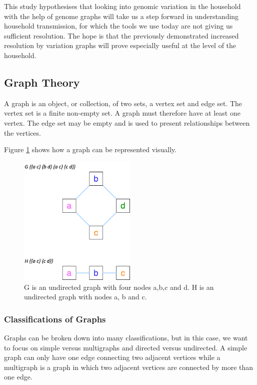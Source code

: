\documentclass[10pt, a4paper]{article}
\begin{document}
This study hypothesises that looking into genomic variation in the household
with the help of genome graphs will take us a step forward in understanding
household transmission, for which the tools we use today are not giving us
sufficient resolution.
The hope is that the previously demonstrated increased resolution by variation
graphs \cite{garrisonVariationGraphToolkit2018} will prove especially useful at
the level of the household.


\clearpage

\subsection{Graph Theory}
\label{sec:orgc90ab18}
A graph is an object, or collection, of two sets, a vertex set and edge set.
The vertex set is a finite non-empty set. A graph must therefore have at least
one vertex.
The edge set may be empty \cite{trudeauIntroductionGraphTheory1993}
and is used to present relationships between the vertices.

Figure \ref{fig:org6a5543e} shows how a graph can be represented
visually.


\begin{figure}[!ht]
\centering
\includegraphics[width=0.5\textwidth]{../Figures/Three-and-four-node-graph.png}
\caption[A Three Node and A Four Node Graph]{\label{fig:org6a5543e}G is an undirected graph with four nodes a,b,c and d. H is an undirected graph with nodes a, b and c.}
\end{figure}

\subsubsection{Classifications of Graphs}
\label{sec:orgc61dc50}
Graphs can be broken down into many classifications, but in this case, we want
to focus on simple versus multigraphs and directed versus undirected.
A simple graph can only have one edge connecting two adjacent vertices while a
multigraph is a graph in which two adjacent vertices are connected by more than
one edge.
\end{document}
